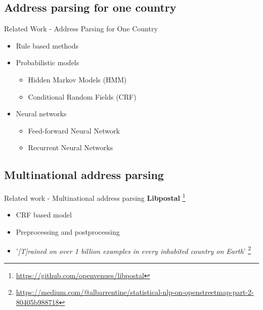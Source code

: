 \documentclass{beamer}
\begin{document}
	\subsection{Address parsing for one country}
	\begin{frame}{Related Work - Address Parsing for One Country}
		\begin{itemize}
			\item<1-> Rule based methods
			\item<2-> Probabilistic models
			\begin{itemize}
				\item<2-> Hidden Markov Models (HMM) \cite{hmm-parsing}
				\item<2-> Conditional Random Fields (CRF) \cite{crf-parsing}
			\end{itemize}
			\item<3-> Neural networks
			\begin{itemize}
				\item<3-> Feed-forward Neural Network \cite{feedforward-parsing}
				\item<3-> Recurrent Neural Networks \cite{rnn-parsing}
			\end{itemize}
		\end{itemize}
	\end{frame}

	\subsection{Multinational address parsing}
	\begin{frame}{Related work - Multinational address parsing}
		\textbf{Libpostal} \footnote{\tiny{\url{https://github.com/openvenues/libpostal}}}
		\begin{itemize}
			\item<1-> CRF based model
			\item<2-> Preprocessing and postprocessing
			\item<3-> '\textit{[T]rained on over 1 billion examples in every inhabited country on Earth}' \footnote{\tiny{\url{https://medium.com/@albarrentine/statistical-nlp-on-openstreetmap-part-2-80405b988718}}}
		\end{itemize}

		\vfill

	\end{frame}
\end{document}
